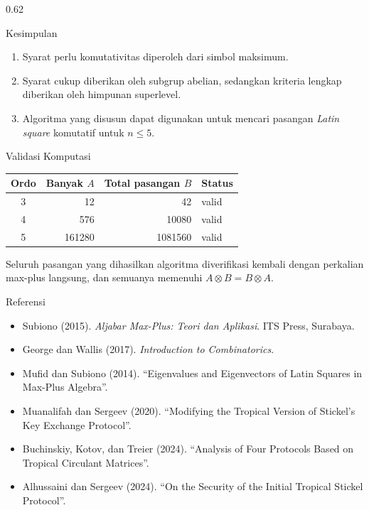 \documentclass[final]{beamer}
\begin{document}
\begin{frame}[t]
\begin{columns}[t]
\begin{column}{0.62\paperwidth}
			\begin{alertblock}{Kesimpulan}
				\begin{enumerate}
					\item Syarat perlu komutativitas diperoleh dari simbol maksimum.
					\item Syarat cukup diberikan oleh subgrup abelian, sedangkan kriteria lengkap diberikan oleh himpunan superlevel.
					\item Algoritma yang disusun dapat digunakan untuk mencari pasangan \textit{Latin square} komutatif untuk $n\leq 5$.
				\end{enumerate}
			\end{alertblock}

			\begin{block}{Validasi Komputasi}
				\begin{center}
					\begin{tabular}{crrl}
						\toprule
						Ordo & Banyak $A$ & Total pasangan $B$ & Status \\
						\midrule
						3    & 12         & 42                 & valid  \\
						4    & 576        & 10080              & valid  \\
						5    & 161280     & 1081560            & valid  \\
						\bottomrule
					\end{tabular}
				\end{center}

				Seluruh pasangan yang dihasilkan algoritma diverifikasi kembali dengan
				perkalian max-plus langsung, dan semuanya memenuhi
				$A\otimes B=B\otimes A$.
			\end{block}

			\begin{block}{Referensi}
				\footnotesize
				\begin{itemize}
					\item Subiono (2015). \textit{Aljabar Max-Plus: Teori dan Aplikasi}. ITS Press, Surabaya.
					\item George dan Wallis (2017). \textit{Introduction to Combinatorics}.
					\item Mufid dan Subiono (2014). ``Eigenvalues and Eigenvectors of Latin Squares in Max-Plus Algebra''.
					\item Muanalifah dan Sergeev (2020). ``Modifying the Tropical Version of Stickel's Key Exchange Protocol''.
					\item Buchinskiy, Kotov, dan Treier (2024). ``Analysis of Four Protocols Based on Tropical Circulant Matrices''.
					\item Alhussaini dan Sergeev (2024). ``On the Security of the Initial Tropical Stickel Protocol''.
				\end{itemize}
			\end{block}


\end{column}
\end{columns}
\end{frame}
\end{document}
